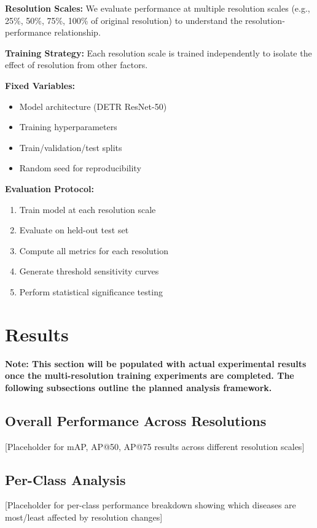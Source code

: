 \documentclass[10pt,twocolumn]{article}
\begin{document}
\textbf{Resolution Scales:} We evaluate performance at multiple resolution scales (e.g., 25\%, 50\%, 75\%, 100\% of original resolution) to understand the resolution-performance relationship.

\textbf{Training Strategy:} Each resolution scale is trained independently to isolate the effect of resolution from other factors.

\textbf{Fixed Variables:}
\begin{itemize}
\item Model architecture (DETR ResNet-50)
\item Training hyperparameters
\item Train/validation/test splits
\item Random seed for reproducibility
\end{itemize}

\textbf{Evaluation Protocol:}
\begin{enumerate}
\item Train model at each resolution scale
\item Evaluate on held-out test set
\item Compute all metrics for each resolution
\item Generate threshold sensitivity curves
\item Perform statistical significance testing
\end{enumerate}

\section{Results}

\textbf{Note: This section will be populated with actual experimental results once the multi-resolution training experiments are completed. The following subsections outline the planned analysis framework.}

\subsection{Overall Performance Across Resolutions}

[Placeholder for mAP, AP@50, AP@75 results across different resolution scales]

\subsection{Per-Class Analysis}

[Placeholder for per-class performance breakdown showing which diseases are most/least affected by resolution changes]
\end{document}
